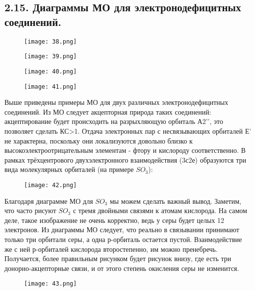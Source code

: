 
	\subsection{2.15. Диаграммы МО для электронодефицитных соединений.} 
	
	\par\bigskip
	
	\begin{figure}[H]
		\centering
		{\texttt{[image: 38.png]}}
	\end{figure}
	
	\begin{figure}[H]
		\centering
		{\texttt{[image: 39.png]}}
	\end{figure}

\begin{figure}[H]
	\centering
	{\texttt{[image: 40.png]}}
\end{figure}

	\begin{figure}[H]
		\centering
		{\texttt{[image: 41.png]}}
	\end{figure}
	
	Выше приведены примеры МО для двух различных
	электронодефицитных соединений. Из МО следует
	акцепторная природа таких соединений: акцептирование
	будет происходить на разрыхляющую орбиталь А2’’, это
	позволяет сделать КС>1. Отдача электронных пар с
	несвязывающих орбиталей Е’ не характерна, поскольку они
	локализуются довольно близко к
	высокоэлектроотрицательным элементам - фтору и
	кислороду соответственно. В рамках трёхцентрового
	двухэлектронного взаимодействия (3с2е) образуются три
	вида молекулярных орбиталей (на примере $SO_3$):
	
	\begin{figure}[H]
		\centering
		{\texttt{[image: 42.png]}}
	\end{figure}
	
	Благодаря диаграмме МО для $SO_3$ мы можем сделать важный
	вывод. Заметим, что часто рисуют $SO_3$ с тремя двойными связями к
	атомам кислорода. На самом деле, такое изображение не очень
	корректно, ведь у серы будет целых 12 электронов. Из диаграммы
	МО следует, что реально в связывании принимают только три
	орбитали серы, а одна р-орбиталь остается пустой. Взаимодействие
	же с ней р-орбиталей кислорода второстепенно, им можно
	пренебречь. Получается, более правильным рисунком будет
	рисунок внизу, где есть три донорно-акцепторные связи, и от этого
	степень окисления серы не изменится.
	
	\begin{figure}[H]
		\centering
		{\texttt{[image: 43.png]}}
	\end{figure}
	
	
	